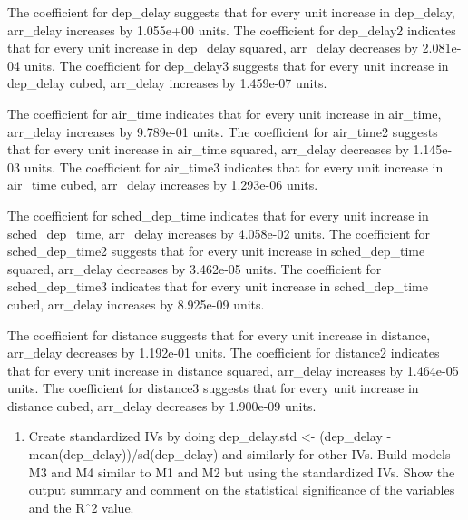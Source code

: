 \documentclass[
]{article}
\providecommand{\tightlist}{%
  \setlength{\itemsep}{0pt}\setlength{\parskip}{0pt}}
\begin{document}
The coefficient for dep\_delay suggests that for every unit increase in
dep\_delay, arr\_delay increases by 1.055e+00 units. The coefficient for
dep\_delay2 indicates that for every unit increase in dep\_delay
squared, arr\_delay decreases by 2.081e-04 units. The coefficient for
dep\_delay3 suggests that for every unit increase in dep\_delay cubed,
arr\_delay increases by 1.459e-07 units.

The coefficient for air\_time indicates that for every unit increase in
air\_time, arr\_delay increases by 9.789e-01 units. The coefficient for
air\_time2 suggests that for every unit increase in air\_time squared,
arr\_delay decreases by 1.145e-03 units. The coefficient for air\_time3
indicates that for every unit increase in air\_time cubed, arr\_delay
increases by 1.293e-06 units.

The coefficient for sched\_dep\_time indicates that for every unit
increase in sched\_dep\_time, arr\_delay increases by 4.058e-02 units.
The coefficient for sched\_dep\_time2 suggests that for every unit
increase in sched\_dep\_time squared, arr\_delay decreases by 3.462e-05
units. The coefficient for sched\_dep\_time3 indicates that for every
unit increase in sched\_dep\_time cubed, arr\_delay increases by
8.925e-09 units.

The coefficient for distance suggests that for every unit increase in
distance, arr\_delay decreases by 1.192e-01 units. The coefficient for
distance2 indicates that for every unit increase in distance squared,
arr\_delay increases by 1.464e-05 units. The coefficient for distance3
suggests that for every unit increase in distance cubed, arr\_delay
decreases by 1.900e-09 units.

\begin{enumerate}
\def\labelenumi{\alph{enumi}.}
\setcounter{enumi}{4}
\tightlist
\item
  Create standardized IVs by doing dep\_delay.std \textless- (dep\_delay
  - mean(dep\_delay))/sd(dep\_delay) and similarly for other IVs. Build
  models M3 and M4 similar to M1 and M2 but using the standardized IVs.
  Show the output summary and comment on the statistical significance of
  the variables and the Rˆ2 value.
\end{enumerate}
\end{document}
